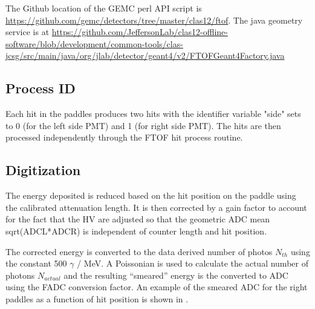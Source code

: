 The Github location of the GEMC perl API script is \url{https://github.com/gemc/detectors/tree/master/clas12/ftof}.
The java geometry service is at
\url{https://github.com/JeffersonLab/clas12-offline-software/blob/development/common-tools/clas-jcsg/src/main/java/org/jlab/detector/geant4/v2/FTOFGeant4Factory.java}

\subsection{Process ID}

Each hit in the paddles produces two hits with the identifier variable "side" sets to 0 (for the left side PMT) and 1 (for right side PMT).
The hits are then processed independently through the FTOF hit process routine.

\subsection{Digitization}

The energy deposited is reduced based on the hit position on the paddle using the calibrated attenuation length. It is then corrected by a gain factor
to account for the fact that the HV are adjusted so that the geometric ADC mean sqrt(ADCL*ADCR) is independent of counter length and hit position.

The corrected energy is converted to the data derived number of photos $N_{th}$ using the constant 500 $\gamma$ / MeV. A Poissonian is used to
calculate the actual number of photons $N_{actual}$ and the resulting ``smeared'' energy is the converted to ADC using the FADC conversion factor.
An example of the smeared ADC for the right paddles as a function of hit position is shown in .

